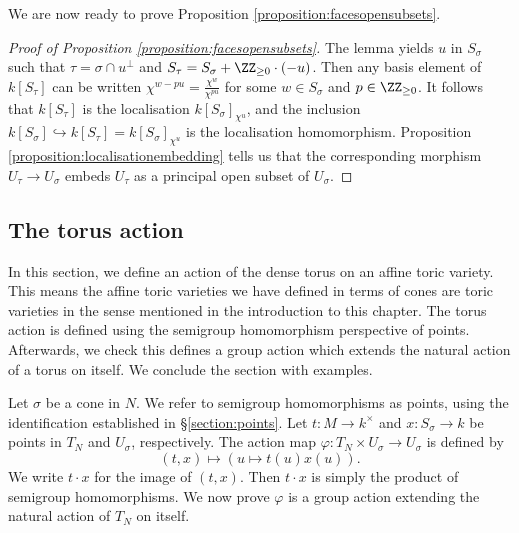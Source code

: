 \documentclass[12pt]{amsart}
\theoremstyle{plain}
\theoremstyle{definition}
\begin{document}
We are now ready to prove Proposition \ref{proposition:facesopensubsets}.

\begin{proof}[{Proof of Proposition \ref{proposition:facesopensubsets}}]
The lemma yields $u$ in $S_\sigma$ such that $\tau = \sigma \cap u^\perp$ and $S_\tau = S_\sigma + \ZZ_{\ge 0} \cdot (-u)$.
Then any basis element of $k[S_\tau]$ can be written $\chi^{w - pu} = \frac{\chi^w}{\chi^{pu}}$ for some $w \in S_\sigma$ and $p \in \ZZ_{\ge 0}$.
It follows that $k[S_\tau]$ is the localisation $k[S_\sigma]_{\chi^u}$, and the inclusion $k[S_\sigma] \hookrightarrow k[S_\tau] = k[S_\sigma]_{\chi^u}$ is the localisation homomorphism.
Proposition \ref{proposition:localisationembedding} tells us that the corresponding morphism $U_\tau \to U_\sigma$ embeds $U_\tau$ as a principal open subset of $U_\sigma$.
\end{proof}

\subsection{The torus action}\label{section:thetorusaction}
In this section, we define an action of the dense torus on an affine toric variety.
This means the affine toric varieties we have defined in terms of cones are toric varieties in the sense mentioned in the introduction to this chapter.
The torus action is defined using the semigroup homomorphism perspective of points.
Afterwards, we check this defines a group action which extends the natural action of a torus on itself.
We conclude the section with examples.

Let $\sigma$ be a cone in $N$.
We refer to semigroup homomorphisms as points, using the identification established in \S\ref{section:points}.
Let $t : M \to k^\times$ and $x : S_\sigma \to k$ be points in $T_N$ and $U_\sigma$, respectively.
The action map $\varphi : T_N \times U_\sigma \to U_\sigma$ is defined by 
$$(t, x) \mapsto (u \mapsto t(u)x(u)).$$
We write $t \cdot x$ for the image of $(t, x)$.
Then $t \cdot x$ is simply the product of semigroup homomorphisms.
We now prove $\varphi$ is a group action extending the natural action of $T_N$ on itself.
\end{document}
